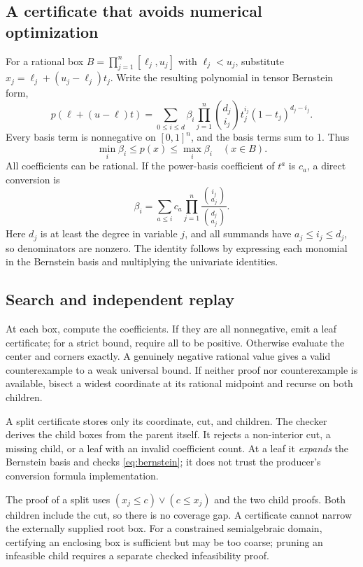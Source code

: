 \documentclass[11pt,a4paper]{article}
\begin{document}
\subsection{A certificate that avoids numerical optimization}
For a rational box $B=\prod_{j=1}^n[\ell_j,u_j]$ with $\ell_j<u_j$, substitute $x_j=\ell_j+(u_j-\ell_j)t_j$. Write the resulting polynomial in tensor Bernstein form,
\begin{equation}\label{eq:bernstein}
 p(\ell+(u-\ell)t)=\sum_{0\le i\le d}\beta_i
 \prod_{j=1}^n\binom{d_j}{i_j}t_j^{i_j}(1-t_j)^{d_j-i_j}.
\end{equation}
Every basis term is nonnegative on $[0,1]^n$, and the basis terms sum to 1. Thus
\[
 \min_i\beta_i\le p(x)\le\max_i\beta_i\quad(x\in B).
\]
All coefficients can be rational. If the power-basis coefficient of $t^a$ is $c_a$, a direct conversion is
\begin{equation}\label{eq:conversion}
 \beta_i=\sum_{a\le i}c_a
    \prod_{j=1}^n\frac{\binom{i_j}{a_j}}{\binom{d_j}{a_j}}.
\end{equation}
Here $d_j$ is at least the degree in variable $j$, and all summands have $a_j\le i_j\le d_j$, so denominators are nonzero. The identity follows by expressing each monomial in the Bernstein basis and multiplying the univariate identities.

\subsection{Search and independent replay}
At each box, compute the coefficients. If they are all nonnegative, emit a leaf certificate; for a strict bound, require all to be positive. Otherwise evaluate the center and corners exactly. A genuinely negative rational value gives a valid counterexample to a weak universal bound. If neither proof nor counterexample is available, bisect a widest coordinate at its rational midpoint and recurse on both children.

A split certificate stores only its coordinate, cut, and children. The checker derives the child boxes from the parent itself. It rejects a non-interior cut, a missing child, or a leaf with an invalid coefficient count. At a leaf it \emph{expands} the Bernstein basis and checks \eqref{eq:bernstein}; it does not trust the producer's conversion formula implementation.

The proof of a split uses $(x_j\le c)\lor(c\le x_j)$ and the two child proofs. Both children include the cut, so there is no coverage gap. A certificate cannot narrow the externally supplied root box. For a constrained semialgebraic domain, certifying an enclosing box is sufficient but may be too coarse; pruning an infeasible child requires a separate checked infeasibility proof.
\end{document}
